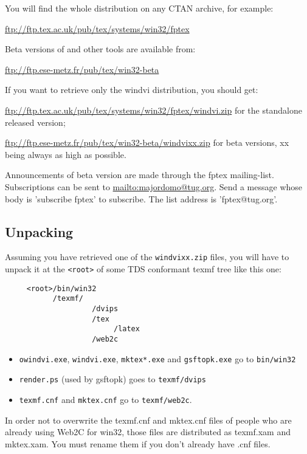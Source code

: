 \documentclass[a4paper,11pt]{article}
\begin{document}
You will find the whole \fptex distribution on any CTAN archive, for example:

\url{ftp://ftp.tex.ac.uk/pub/tex/systems/win32/fptex}

Beta versions of \fptex and other tools are available from:

\url{ftp://ftp.ese-metz.fr/pub/tex/win32-beta}

If you want to retrieve only the windvi distribution, you should get:

\url{ftp://ftp.tex.ac.uk/pub/tex/systems/win32/fptex/windvi.zip}
for the standalone released version;

\url{ftp://ftp.ese-metz.fr/pub/tex/win32-beta/windvixx.zip}
for beta versions, xx being always as high as possible.

Announcements of beta version are made through the fptex
mailing-list.  Subscriptions can be sent to
\url{mailto:majordomo@tug.org}.  Send a message whose body is
'subscribe fptex' to subscribe. The list address is 'fptex@tug.org'.

\subsection{Unpacking}

Assuming you have retrieved one of the \texttt{windvixx.zip} files, you will
have to unpack it at the \texttt{<root>} of some TDS conformant texmf
tree like this one:


\begin{verbatim}
     <root>/bin/win32
           /texmf/
                    /dvips
                    /tex
                         /latex
                    /web2c
\end{verbatim}

\begin{itemize}
\item \texttt{owindvi.exe}, \texttt{windvi.exe}, 
 \texttt{mktex*.exe} and \texttt{gsftopk.exe} go to
  \texttt{bin/win32}
\item   \texttt{render.ps} (used by gsftopk) goes to \texttt{texmf/dvips}
\item   \texttt{texmf.cnf} and \texttt{mktex.cnf} go to \texttt{texmf/web2c}.
\end{itemize}

In order not to overwrite the texmf.cnf and mktex.cnf files of people
who are already using Web2C for win32, those files are distributed as
texmf.xam and mktex.xam. You must rename them if you don't already
have .cnf files.
\end{document}
